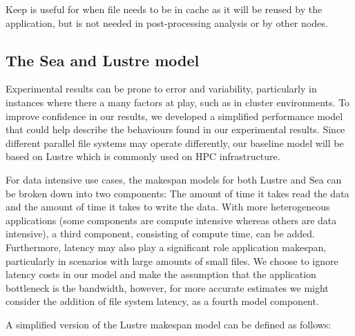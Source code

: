 \documentclass[10pt,journal,compsoc]{IEEEtran}
\begin{document}
Keep is useful for when file needs to be in cache as it will be reused by
the application, but is not needed in post-processing analysis or by other nodes.


\subsection{The Sea and Lustre model}\label{ss:sea-comp:model}

      Experimental results can be prone to error and variability, particularly in instances
      where there a many factors at play, such as in cluster environments. To improve
      confidence in our results, we developed a simplified performance model that
      could help describe the behaviours found in our experimental results. Since different
      parallel file systems may operate differently, our baseline model will be
      based on Lustre which is commonly used on HPC infrastructure.

      For data intensive use cases, the makespan models for both Lustre and Sea
      can be broken down into two components: The amount of time it takes read
      the data and the amount of time it takes to write the data. With more
      heterogeneous applications (some components are compute intensive whereas
      others are data intensive), a third component, consisting of compute time,
      can be added. Furthermore, latency may also play a significant role
      application makespan, particularly in scenarios with large amounts of
      small files. We choose to ignore latency costs in our model and make the
      assumption that the application bottleneck is the bandwidth, however, for
      more accurate estimates we might consider the addition of file system
      latency, as a fourth model component.

      A simplified version of the Lustre makespan model can be defined as
      follows:
\end{document}
